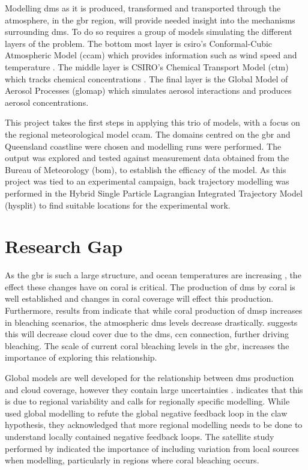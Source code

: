 Modelling \gls{dms} as it is produced, transformed and transported through the atmosphere, in the \gls{gbr} region, will provide needed insight into the mechanisms surrounding \gls{dms}. To do so requires a group of models simulating the different layers of the problem. The bottom most layer is \gls{csiro}'s Conformal-Cubic Atmospheric Model (\gls{ccam}) which provides information such as wind speed and temperature \citep{mcgregor:2005wz}. The middle layer is CSIRO's Chemical Transport Model (\gls{ctm}) which tracks chemical concentrations \citep{cope:2009tz}. The final layer is the Global Model of Aerosol Processes (\gls{glomap}) which simulates aerosol interactions and produces aerosol concentrations. 

This project takes the first steps in applying this trio of models, with a focus on the regional meteorological model \gls{ccam}. The domains centred on the \gls{gbr} and Queensland coastline were chosen and modelling runs were performed. The output was explored and tested against measurement data obtained from the Bureau of Meteorology (\gls{bom}), to establish the efficacy of the model. As this project was tied to an experimental campaign, back trajectory modelling was performed in the Hybrid Single Particle Lagrangian Integrated Trajectory Model (\gls{hysplit}) to find suitable locations for the experimental work.

\section{Research Gap}
\label{sec:resgap}

As the \gls{gbr} is such a large structure, and ocean temperatures are increasing \citep{hoeghguldberg:1999bi}, the effect these changes have on coral is critical. The production of \gls{dms} by coral is well established \citep{jones:2005ez,fischer2012atmospheric} and changes in coral coverage will effect this production. Furthermore, results from \citet{fischer2012atmospheric} indicate that while coral production of \gls{dmsp} increases in bleaching scenarios, the atmospheric \gls{dms} levels decrease drastically. \citet{fischer2012atmospheric} suggests this will decrease cloud cover due to the \gls{dms}, \gls{ccn} connection, further driving bleaching. The scale of current coral bleaching levels in the \gls{gbr}, increases the importance of exploring this relationship.

Global models are well developed for the relationship between \gls{dms} production and cloud coverage, however they contain large uncertainties \citep{woodhouse:2010ed}. \citet{cainey:2007jj} indicates that this is due to regional variability and calls for regionally specific modelling. While \citet{quinn:2011iv} used global modelling to refute the global negative feedback loop in the \gls{claw} hypothesis, they acknowledged that more regional modelling needs to be done to understand locally contained negative feedback loops. The satellite study performed by \citet{leahy:2013en} indicated the importance of including variation from local sources when modelling, particularly in regions where coral bleaching occurs.

